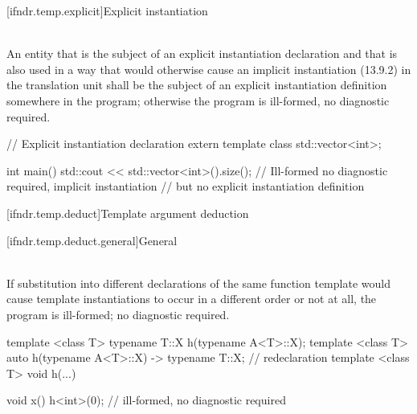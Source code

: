 [ifndr.temp.explicit]{Explicit instantiation}

\pnum
{} \\
An entity that is the subject of
an explicit instantiation declaration and that is also used in a way that would otherwise cause an implicit
instantiation (13.9.2) in the translation unit shall be the subject of an explicit instantiation definition
somewhere in the program; otherwise the program is ill-formed, no diagnostic required.

\pnum
\begin{example}
\begin{codeblock}
// Explicit instantiation declaration
extern template class std::vector<int>;

int main() {
  std::cout << std::vector<int>().size(); // Ill-formed no diagnostic required, implicit instantiation
                                          // but no explicit instantiation definition
}
\end{codeblock}
\end{example}


[ifndr.temp.deduct]{Template argument deduction}

[ifndr.temp.deduct.general]{General}

\pnum
{} \\
If substitution
into different declarations of the same function template would cause template instantiations to occur in a
different order or not at all, the program is ill-formed; no diagnostic required.

\pnum
\begin{example}
\begin{codeblock}
template <class T> typename T::X h(typename A<T>::X);
template <class T> auto h(typename A<T>::X) -> typename T::X; // redeclaration
template <class T> void h(...) { }

void x() {
  h<int>(0); // ill-formed, no diagnostic required
}
\end{codeblock}
\end{example}
